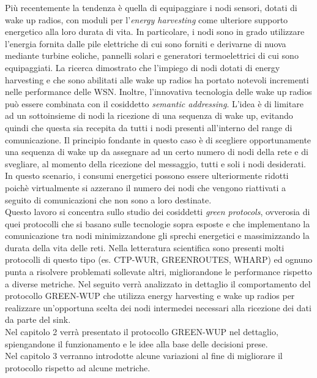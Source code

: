 \documentclass[binding=0.6cm,TFA]{sapthesis}
\begin{document}
Più recentemente la tendenza è quella di equipaggiare i nodi sensori, dotati di wake up radios, con moduli per l'\emph{energy harvesting} come ulteriore
supporto energetico alla loro durata di vita. In particolare, i nodi sono in grado utilizzare l'energia fornita dalle pile elettriche di cui sono
forniti e derivarne di nuova mediante turbine eoliche, pannelli solari e generatori termoelettrici di cui sono equipaggiati. La ricerca dimostrato che l'impiego
di nodi dotati di energy harvesting \cite{energy-harvesting-paper} e che sono abilitati alle wake up radios \cite{wake-up-radios-paper} ha portato notevoli
incrementi nelle performance delle WSN. Inoltre, l'innovativa tecnologia delle wake up radios può essere combinata con il cosiddetto \emph{semantic addressing}.
L'idea è di limitare ad un sottoinsieme di nodi la ricezione di una sequenza di wake up, evitando quindi che questa sia recepita da tutti i nodi presenti all'interno
del range di comunicazione. Il principio fondante in questo caso è di scegliere
opportunamente una sequenza di wake up da assegnare ad un certo numero di nodi della rete e di svegliare, al momento della ricezione del messaggio, tutti e soli i
nodi desiderati. In questo scenario, i consumi energetici possono essere ulteriormente ridotti poichè virtualmente si azzerano il numero dei nodi che vengono
riattivati a seguito di comunicazioni che non sono a loro destinate.\\

Questo lavoro si concentra sullo studio dei cosiddetti \emph{green protocols}, ovverosia di quei protocolli che si basano sulle tecnologie sopra esposte
e che implementano la comunicazione tra nodi minimizzandone gli sprechi energetici e massimizzando la durata della vita delle reti. Nella letteratura scientifica
sono presenti molti protocolli di questo tipo (es. CTP-WUR, GREENROUTES, WHARP) ed ognuno punta a risolvere problemati sollevate altri, migliorandone le performance
rispetto a diverse metriche. Nel seguito verrà analizzato in dettaglio il comportamento del protocollo GREEN-WUP che utilizza energy harvesting e
wake up radios per realizzare un'opportuna scelta dei nodi intermedei necessari alla ricezione dei dati da parte del sink.\\

Nel capitolo 2 verrà presentato il protocollo GREEN-WUP nel dettaglio, spiengandone il funzionamento e le idee alla base delle decisioni prese.\\

Nel capitolo 3 verranno introdotte alcune variazioni al fine di migliorare il protocollo rispetto ad alcune metriche.\\
\end{document}

